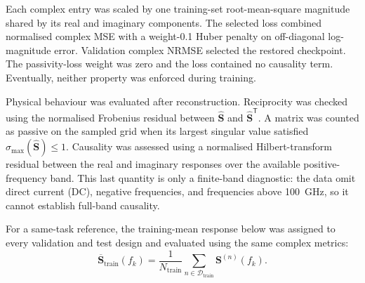Each complex entry was scaled by one training-set root-mean-square magnitude shared by
its real and imaginary components. The selected loss combined normalised complex MSE
with a weight-0.1 Huber penalty on off-diagonal log-magnitude error. Validation complex
NRMSE selected the restored checkpoint. The passivity-loss weight was zero and the loss
contained no causality term. Eventually, neither property was enforced during training.

Physical behaviour was evaluated after reconstruction. Reciprocity was checked using the
normalised Frobenius residual between $\widehat{\mathbf{S}}$ and
$\widehat{\mathbf{S}}^{\mathsf{T}}$. A matrix was counted as passive on the sampled grid
when its largest singular value satisfied $\sigma_{\max}(\widehat{\mathbf{S}})\leq1$.
Causality was assessed using a normalised Hilbert-transform residual between the real
and imaginary responses over the available positive-frequency band. This last quantity
is only a finite-band diagnostic: the data omit direct current (DC), negative
frequencies, and frequencies above 100~GHz, so it cannot establish full-band causality.

For a same-task reference, the training-mean response below was assigned to every
validation and test design and evaluated using the same complex metrics:
\begin{equation}
    \overline{\mathbf{S}}_{\mathrm{train}}(f_k)=
    \frac{1}{N_{\mathrm{train}}}
    \sum_{n\in\mathcal{D}_{\mathrm{train}}}\mathbf{S}^{(n)}(f_k).
    \label{eq:mean-smatrix-reference}
\end{equation}
